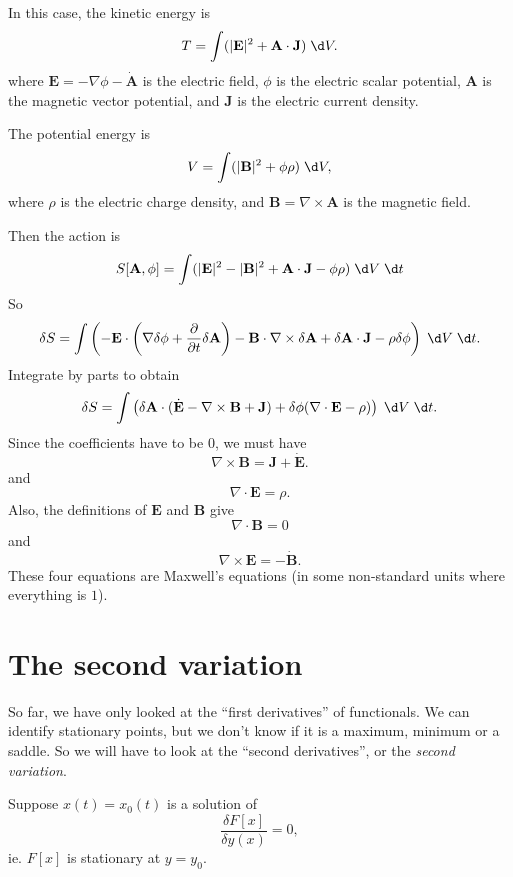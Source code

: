 \documentclass[a4paper]{article}
\begin{document}
\begin{eg}
  In this case, the kinetic energy is
  \[
    T = \int (|\mathbf{E}|^2 + \mathbf{A}\cdot \mathbf{J}) \;\d V.
  \]
  where $\mathbf{E} = -\nabla \phi - \dot{\mathbf{A}}$ is the electric field, $\phi$ is the electric scalar potential, $\mathbf{A}$ is the magnetic vector potential, and $\mathbf{J}$ is the electric current density.

  The potential energy is
  \[
    V = \int (|\mathbf{B}|^2 + \phi \rho)\;\d V,
  \]
  where $\rho$ is the electric charge density, and $\mathbf{B} = \nabla\times \mathbf{A}$ is the magnetic field.

  Then the action is
  \[
    S[\mathbf{A}, \phi] = \int (|\mathbf{E}|^2 - |\mathbf{B}|^2 + \mathbf{A}\cdot \mathbf{J} - \phi \rho)\;\d V\;\d t
  \]
  So
  \[
    \delta S = \int \left(-\mathbf{E}\cdot \left(\nabla \delta\phi + \frac{\partial}{\partial t} \delta \mathbf{A}\right) - \mathbf{B}\cdot \nabla \times \delta \mathbf{A} + \delta \mathbf{A}\cdot \mathbf{J} - \rho\delta\phi\right)\;\d V\;\d t.
  \]
  Integrate by parts to obtain
  \[
    \delta S = \int\left(\delta\mathbf{A}\cdot (\dot{\mathbf{E}} - \nabla\times \mathbf{B} + \mathbf{J}) + \delta \phi(\nabla\cdot \mathbf{E} - \rho)\right)\;\d V\;\d t.
  \]
  Since the coefficients have to be $0$, we must have
  \[
    \nabla \times \mathbf{B} = \mathbf{J} + \dot{\mathbf{E}}.
  \]
  and
  \[
    \nabla \cdot \mathbf{E} = \rho.
  \]
  Also, the definitions of $\mathbf{E}$ and $\mathbf{B}$ give
  \[
    \nabla\cdot \mathbf{B} = 0
  \]
  and 
  \[
    \nabla \times \mathbf{E} = - \dot{\mathbf{B}}.
  \]
  These four equations are Maxwell's equations (in some non-standard units where everything is $1$).
\end{eg}
\section{The second variation}
So far, we have only looked at the ``first derivatives'' of functionals. We can identify stationary points, but we don't know if it is a maximum, minimum or a saddle. So we will have to look at the ``second derivatives'', or the \emph{second variation}.

Suppose $x(t) = x_0(t)$ is a solution of 
\[
  \frac{\delta F[x]}{\delta y(x)} = 0,
\]
ie. $F[x]$ is stationary at $y = y_0$.
\end{document}
